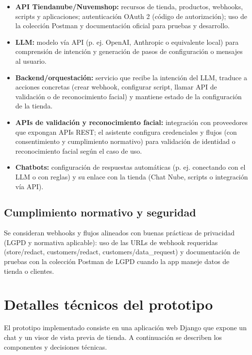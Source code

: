 \documentclass[9pt,a4paper,twocolumn,twoside]{rho-class/rho}
\begin{document}
\begin{itemize}
    \item \textbf{API Tiendanube/Nuvemshop:} recursos de tienda, productos, webhooks, scripts y aplicaciones; autenticación OAuth 2 (código de autorización); uso de la colección Postman y documentación oficial para pruebas y desarrollo.
    \item \textbf{LLM:} modelo vía API (p. ej. OpenAI, Anthropic o equivalente local) para comprensión de intención y generación de pasos de configuración o mensajes al usuario.
    \item \textbf{Backend/orquestación:} servicio que recibe la intención del LLM, traduce a acciones concretas (crear webhook, configurar script, llamar API de validación o de reconocimiento facial) y mantiene estado de la configuración de la tienda.
    \item \textbf{APIs de validación y reconocimiento facial:} integración con proveedores que expongan APIs REST; el asistente configura credenciales y flujos (con consentimiento y cumplimiento normativo) para validación de identidad o reconocimiento facial según el caso de uso.
    \item \textbf{Chatbots:} configuración de respuestas automáticas (p. ej. conectando con el LLM o con reglas) y su enlace con la tienda (Chat Nube, scripts o integración vía API).
\end{itemize}

\subsection{Cumplimiento normativo y seguridad}

Se consideran webhooks y flujos alineados con buenas prácticas de privacidad (LGPD y normativa aplicable): uso de las URLs de webhook requeridas (store/redact, customers/redact, customers/data\_request) y documentación de pruebas con la colección Postman de LGPD \cite{tiendanube-api-utils} cuando la app maneje datos de tienda o clientes.

\section{Detalles técnicos del prototipo}

El prototipo implementado consiste en una aplicación web Django que expone un chat y un visor de vista previa de tienda. A continuación se describen los componentes y decisiones técnicas.
\end{document}
